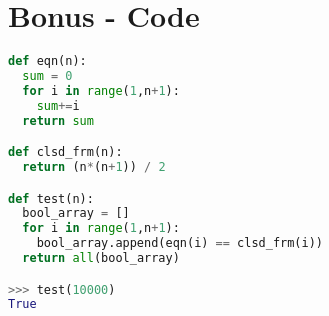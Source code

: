\documentclass{article}
\begin{document}
\section{Bonus - Code}

\begin{lstlisting}[language=Python, caption = This script tests if the equation and closed form are equal for a range of a given number. A boolean for each iteration is passed to an list. If all booleans in the list are true we know our test has passed.]
def eqn(n):
  sum = 0
  for i in range(1,n+1):
    sum+=i
  return sum

def clsd_frm(n):
  return (n*(n+1)) / 2

def test(n):
  bool_array = []
  for i in range(1,n+1):
    bool_array.append(eqn(i) == clsd_frm(i))
  return all(bool_array)

>>> test(10000)
True

 
\end{lstlisting}
\end{document}
